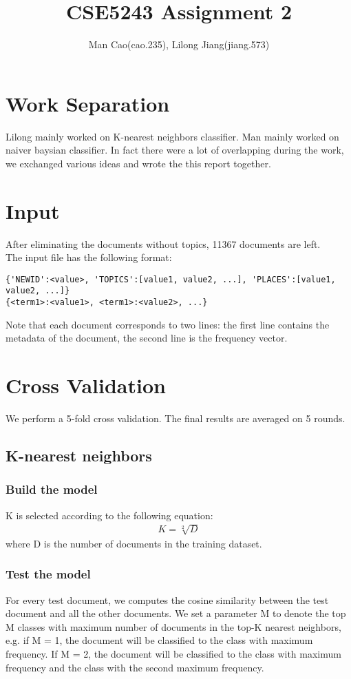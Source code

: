 \documentclass{article}
\begin{document}
\title{CSE5243 Assignment 2}
\author{Man Cao(cao.235), Lilong Jiang(jiang.573)}
\maketitle

\section{Work Separation}
Lilong mainly worked on K-nearest neighbors classifier. Man mainly worked on naiver baysian classifier. In fact there were a lot of overlapping during the work, we exchanged various ideas and wrote the this report together.
\section{Input}
After eliminating the documents without topics, 11367 documents are left.\\ 
The input file has the following format:
\begin{verbatim}
{'NEWID':<value>, 'TOPICS':[value1, value2, ...], 'PLACES':[value1, value2, ...]}
{<term1>:<value1>, <term1>:<value2>, ...}
\end{verbatim}
Note that each document corresponds to two lines: the first line contains the
metadata of the document, the second line is the frequency vector.

\section{Cross Validation}
We perform a 5-fold cross validation. The final results are averaged on 5 rounds.
\subsection{K-nearest neighbors}
\subsubsection{Build the model}
K is selected according to the following equation:
\begin{align*}K = \sqrt[2]{D}\end{align*}
where D is the number of documents in the training dataset.
\subsubsection{Test the model}
For every test document, we computes the cosine similarity between the test document and all the other documents. We set a parameter M to denote the top M classes with maximum number of documents in the top-K nearest neighbors, e.g. if M = 1, the document will be classified to the class with maximum frequency. If M = 2, the document will be classified to the class with maximum frequency and the class with the second maximum frequency.
\end{document}
